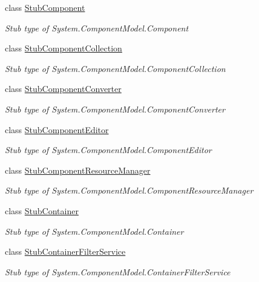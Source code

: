 \begin{DoxyCompactItemize}
class \hyperlink{class_system_1_1_component_model_1_1_fakes_1_1_stub_component}{Stub\-Component}
\begin{DoxyCompactList}\small\item\em Stub type of System.\-Component\-Model.\-Component\end{DoxyCompactList}\item 
class \hyperlink{class_system_1_1_component_model_1_1_fakes_1_1_stub_component_collection}{Stub\-Component\-Collection}
\begin{DoxyCompactList}\small\item\em Stub type of System.\-Component\-Model.\-Component\-Collection\end{DoxyCompactList}\item 
class \hyperlink{class_system_1_1_component_model_1_1_fakes_1_1_stub_component_converter}{Stub\-Component\-Converter}
\begin{DoxyCompactList}\small\item\em Stub type of System.\-Component\-Model.\-Component\-Converter\end{DoxyCompactList}\item 
class \hyperlink{class_system_1_1_component_model_1_1_fakes_1_1_stub_component_editor}{Stub\-Component\-Editor}
\begin{DoxyCompactList}\small\item\em Stub type of System.\-Component\-Model.\-Component\-Editor\end{DoxyCompactList}\item 
class \hyperlink{class_system_1_1_component_model_1_1_fakes_1_1_stub_component_resource_manager}{Stub\-Component\-Resource\-Manager}
\begin{DoxyCompactList}\small\item\em Stub type of System.\-Component\-Model.\-Component\-Resource\-Manager\end{DoxyCompactList}\item 
class \hyperlink{class_system_1_1_component_model_1_1_fakes_1_1_stub_container}{Stub\-Container}
\begin{DoxyCompactList}\small\item\em Stub type of System.\-Component\-Model.\-Container\end{DoxyCompactList}\item 
class \hyperlink{class_system_1_1_component_model_1_1_fakes_1_1_stub_container_filter_service}{Stub\-Container\-Filter\-Service}
\begin{DoxyCompactList}\small\item\em Stub type of System.\-Component\-Model.\-Container\-Filter\-Service\end{DoxyCompactList}\item 

\end{DoxyCompactItemize}
